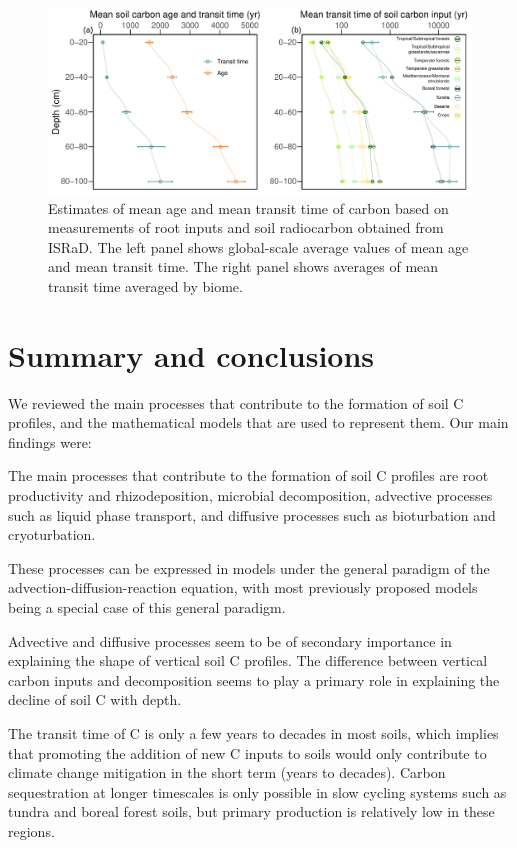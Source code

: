 \documentclass[11pt, oneside, a4paper]{article}   	%
\begin{document}
\begin{figure}[htbp]
   \centering
   \includegraphics[width=\textwidth]{Figures/biomeTransitTimes.pdf} %
   \caption{Estimates of mean age and mean transit time of carbon based on measurements of root inputs and soil radiocarbon obtained from ISRaD. The left panel shows global-scale average values of mean age and mean transit time. The right panel shows averages of mean transit time averaged by biome.}
   \label{fig:AgeTTprofiles}
\end{figure}

\section{Summary and conclusions}
We reviewed the main processes that contribute to the formation of soil C profiles, and the mathematical models that are used to represent them. 
Our main findings were: 
\begin{enumerate*}
\item The main processes that contribute to the formation of soil C profiles are root productivity and rhizodeposition, microbial decomposition, advective processes such as liquid phase transport, and diffusive processes such as bioturbation and cryoturbation. 
\item These processes can be expressed in models under the general paradigm of the advection-diffusion-reaction equation, with most previously proposed models being a special case of this general paradigm. 
\item Advective and diffusive processes seem to be of secondary importance in explaining the shape of vertical soil C profiles. The difference between vertical carbon inputs and decomposition seems to play a primary role in explaining the decline of soil C with depth. 
\item The transit time of C is only a few years to decades in most soils, which implies that promoting the addition of new C inputs to soils would only contribute to climate change mitigation in the short term (years to decades). Carbon sequestration at longer timescales is only possible in slow cycling systems such as tundra and boreal forest soils, but primary production is relatively low in these regions.
\end{enumerate*}
\end{document}
